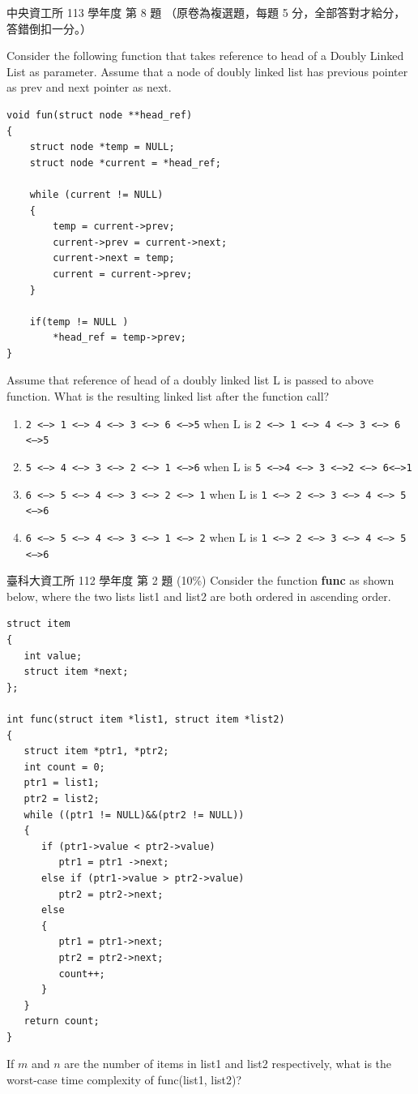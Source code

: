 \begin{pastexam}[label={px:ll-3}]{中央資工所 113 學年度 第 8 題}
（原卷為複選題，每題 5 分，全部答對才給分，答錯倒扣一分。）

Consider the following function that takes reference to head of a Doubly Linked List as
parameter. Assume that a node of doubly linked list has previous pointer as prev and next
pointer as next.
\begin{verbatim}
void fun(struct node **head_ref)
{
    struct node *temp = NULL;
    struct node *current = *head_ref;

    while (current != NULL)
    {
        temp = current->prev;
        current->prev = current->next;
        current->next = temp;
        current = current->prev;
    }

    if(temp != NULL )
        *head_ref = temp->prev;
}
\end{verbatim}
Assume that reference of head of a doubly linked list L is passed to above function. What
is the resulting linked list after the function call?
\begin{enumerate}[label=(\Alph*)]
\item \texttt{2 <--> 1 <--> 4 <--> 3 <--> 6 <-->5} when L is
\texttt{2 <--> 1 <--> 4 <--> 3 <--> 6 <-->5}
\item \texttt{5 <--> 4 <--> 3 <--> 2 <--> 1 <-->6} when L is
\texttt{5 <-->4 <--> 3 <-->2 <--> 6<-->1}
\item \texttt{6 <--> 5 <--> 4 <--> 3 <--> 2 <--> 1} when L is
\texttt{1 <--> 2 <--> 3 <--> 4 <--> 5 <-->6}
\item \texttt{6 <--> 5 <--> 4 <--> 3 <--> 1 <--> 2} when L is
\texttt{1 <--> 2 <--> 3 <--> 4 <--> 5 <-->6}
\end{enumerate}
\end{pastexam}

\begin{pastexam}[label={px:ll-4}]{臺科大資工所 112 學年度 第 2 題}
(10\%) Consider the function \textbf{func} as shown below, where the two lists list1 and
list2 are both ordered in ascending order.
\begin{verbatim}
struct item
{
   int value;
   struct item *next;
};

int func(struct item *list1, struct item *list2)
{
   struct item *ptr1, *ptr2;
   int count = 0;
   ptr1 = list1;
   ptr2 = list2;
   while ((ptr1 != NULL)&&(ptr2 != NULL))
   {
      if (ptr1->value < ptr2->value)
         ptr1 = ptr1 ->next;
      else if (ptr1->value > ptr2->value)
         ptr2 = ptr2->next;
      else
      {
         ptr1 = ptr1->next;
         ptr2 = ptr2->next;
         count++;
      }
   }
   return count;
}
\end{verbatim}
If $m$ and $n$ are the number of items in list1 and list2 respectively, what is the
worst-case time complexity of func(list1, list2)?
\end{pastexam}


